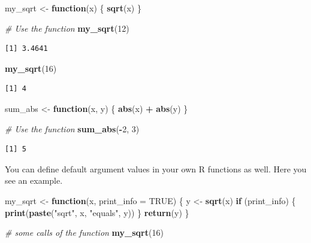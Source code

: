 \documentclass[
]{book}
\newenvironment{Shaded}{\begin{snugshade}}{\end{snugshade}}
\newcommand{\CommentTok}[1]{\textcolor[rgb]{0.56,0.35,0.01}{\textit{#1}}}
\newcommand{\ControlFlowTok}[1]{\textcolor[rgb]{0.13,0.29,0.53}{\textbf{#1}}}
\newcommand{\DataTypeTok}[1]{\textcolor[rgb]{0.13,0.29,0.53}{#1}}
\newcommand{\DecValTok}[1]{\textcolor[rgb]{0.00,0.00,0.81}{#1}}
\newcommand{\KeywordTok}[1]{\textcolor[rgb]{0.13,0.29,0.53}{\textbf{#1}}}
\newcommand{\NormalTok}[1]{#1}
\newcommand{\OperatorTok}[1]{\textcolor[rgb]{0.81,0.36,0.00}{\textbf{#1}}}
\newcommand{\OtherTok}[1]{\textcolor[rgb]{0.56,0.35,0.01}{#1}}
\newcommand{\StringTok}[1]{\textcolor[rgb]{0.31,0.60,0.02}{#1}}
\begin{document}
\begin{Shaded}
\begin{Highlighting}[]
\NormalTok{my_sqrt <-}\StringTok{ }\ControlFlowTok{function}\NormalTok{(x) \{}
  \KeywordTok{sqrt}\NormalTok{(x)}
\NormalTok{\}}

\CommentTok{# Use the function}
\KeywordTok{my_sqrt}\NormalTok{(}\DecValTok{12}\NormalTok{)}
\end{Highlighting}
\end{Shaded}

\begin{verbatim}
[1] 3.4641
\end{verbatim}

\begin{Shaded}
\begin{Highlighting}[]
\KeywordTok{my_sqrt}\NormalTok{(}\DecValTok{16}\NormalTok{)}
\end{Highlighting}
\end{Shaded}

\begin{verbatim}
[1] 4
\end{verbatim}

\begin{Shaded}
\begin{Highlighting}[]
\NormalTok{sum_abs <-}\StringTok{ }\ControlFlowTok{function}\NormalTok{(x, y) \{}
  \KeywordTok{abs}\NormalTok{(x) }\OperatorTok{+}\StringTok{ }\KeywordTok{abs}\NormalTok{(y)}
\NormalTok{\}}

\CommentTok{# Use the function}
\KeywordTok{sum_abs}\NormalTok{(}\OperatorTok{-}\DecValTok{2}\NormalTok{, }\DecValTok{3}\NormalTok{)}
\end{Highlighting}
\end{Shaded}

\begin{verbatim}
[1] 5
\end{verbatim}

You can define default argument values in your own R functions as well. Here you see an example.

\begin{Shaded}
\begin{Highlighting}[]
\NormalTok{my_sqrt <-}\StringTok{ }\ControlFlowTok{function}\NormalTok{(x, }\DataTypeTok{print_info =} \OtherTok{TRUE}\NormalTok{) \{}
\NormalTok{  y <-}\StringTok{ }\KeywordTok{sqrt}\NormalTok{(x)}
  \ControlFlowTok{if}\NormalTok{ (print_info) \{}
    \KeywordTok{print}\NormalTok{(}\KeywordTok{paste}\NormalTok{(}\StringTok{"sqrt"}\NormalTok{, x, }\StringTok{"equals"}\NormalTok{, y))}
\NormalTok{  \}}
  \KeywordTok{return}\NormalTok{(y)}
\NormalTok{\}}

\CommentTok{# some calls of the function}
\KeywordTok{my_sqrt}\NormalTok{(}\DecValTok{16}\NormalTok{)}
\end{Highlighting}
\end{Shaded}
\end{document}
